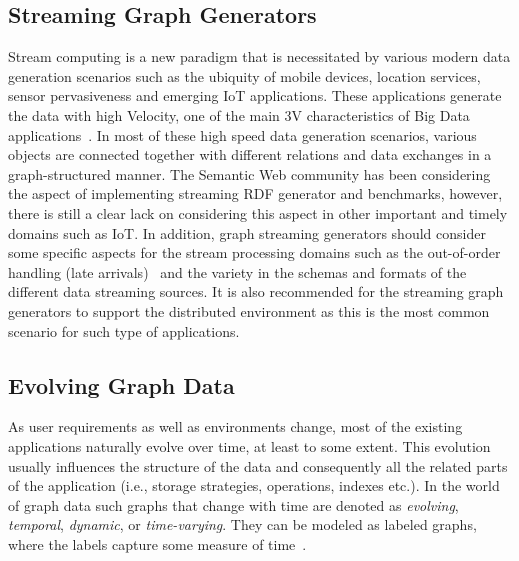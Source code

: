 \subsection{Streaming Graph Generators}
Stream computing is a new paradigm that is necessitated by various modern data generation scenarios such as the ubiquity of mobile devices, location services,
sensor pervasiveness and emerging IoT applications. These applications generate the data with high Velocity, one of the main 3V characteristics of Big Data applications~\cite{sakr2016big}. In most of these high speed data generation scenarios, various objects are connected together with different relations and data exchanges  in a graph-structured manner. The Semantic Web community has been considering the aspect of implementing streaming RDF generator and benchmarks, however, there is still a clear lack on considering this aspect in other important and timely domains such as IoT. %
In addition, graph streaming generators should  consider some specific aspects for the stream processing domains such as the out-of-order handling (late arrivals)~\cite{li2008out} and the variety in the schemas and formats of the different data streaming sources. It is also recommended for the streaming graph generators to support the distributed environment as this is the most common scenario for such type of applications.

\subsection{Evolving Graph Data}
\label{sec:evolving}
As user requirements as well as environments change, most of the existing
applications naturally evolve over time, at least to some extent. This evolution
usually influences the structure of the data and consequently all the related
parts of the application (i.e., storage strategies, operations, indexes etc.).
In the world of graph data such graphs that change with time are denoted as \emph{evolving}, \emph{temporal}, \emph{dynamic}, or \emph{time-varying}. They can be modeled as labeled graphs, where the labels capture some measure of time~\cite{Michail2015}.

